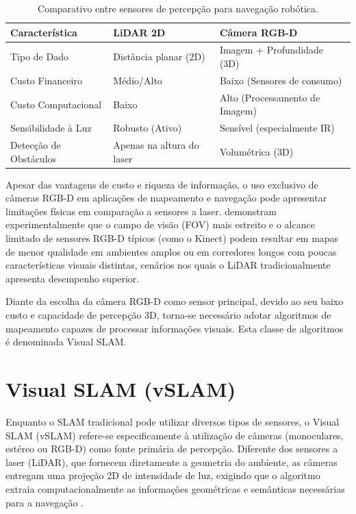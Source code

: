 \begin{table}[H]
\centering
\caption{Comparativo entre sensores de percepção para navegação robótica.}
\label{tab:comparativo_sensores}
\begin{tabular}{|l|l|l|}
\hline
\textbf{Característica} & \textbf{LiDAR 2D} & \textbf{Câmera RGB-D} \\ \hline
Tipo de Dado & Distância planar (2D) & Imagem + Profundidade (3D) \\ \hline
Custo Financeiro & Médio/Alto & Baixo (Sensores de consumo) \\ \hline
Custo Computacional & Baixo & Alto (Processamento de Imagem) \\ \hline
Sensibilidade à Luz & Robusto (Ativo) & Sensível (especialmente IR) \\ \hline
Detecção de Obstáculos & Apenas na altura do laser & Volumétrica (3D) \\ \hline
\end{tabular}
\end{table}

Apesar das vantagens de custo e riqueza de informação, o uso exclusivo de câmeras RGB-D em aplicações de mapeamento e navegação pode apresentar limitações físicas em comparação a sensores a laser.  demonstram experimentalmente que o campo de visão (FOV) mais estreito e o alcance limitado de sensores RGB-D típicos (como o Kinect) podem resultar em mapas de menor qualidade em ambientes amplos ou em corredores longos com poucas características visuais distintas, cenários nos quais o LiDAR tradicionalmente apresenta desempenho superior.

Diante da escolha da câmera RGB-D como sensor principal, devido ao seu baixo custo e capacidade de percepção 3D, torna-se necessário adotar algoritmos de mapeamento capazes de processar informações visuais. Esta classe de algoritmos é denominada Visual SLAM.

\section{Visual SLAM (vSLAM)}
\label{sec:visual_slam}

Enquanto o SLAM tradicional pode utilizar diversos tipos de sensores, o Visual SLAM (vSLAM) refere-se especificamente à utilização de câmeras (monoculares, estéreo ou RGB-D) como fonte primária de percepção. Diferente dos sensores a laser (LiDAR), que fornecem diretamente a geometria do ambiente, as câmeras entregam uma projeção 2D de intensidade de luz, exigindo que o algoritmo extraia computacionalmente as informações geométricas e semânticas necessárias para a navegação \cite{jin2019visualslamrgbd, mokssit2023deeplearningtechniques}.

